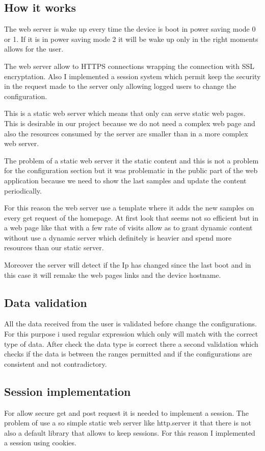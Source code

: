 		\subsection{How it works}
		The web server is wake up every time the device is boot in power saving mode 0 or 1. If it is in power saving mode 2 it will be wake up only in the right moments allows for the user.

		The web server allow to HTTPS connections wrapping the connection with SSL encryptation. Also I implemented a session system which permit keep the security in the request made to the server only allowing logged users to change the configuration.

		This is a static web server which means that only can serve static web pages. This is desirable in our project because we do not need a complex web page and also the resources consumed by the server are smaller than in a more complex web server.

		The problem of a static web server it the static content and this is not a problem for the configuration section but it was problematic in the public part of the web application because we need to show the last samples and update the content periodically.

		For this reason the web server use a template where it adds the new samples on every get request of the homepage. At first look that seems not so efficient but in a web page like that with a few rate of visits allow as to grant dynamic content without use a dynamic server which definitely is heavier and spend more resources than our static server.

		Moreover the server will detect if the Ip has changed since the last boot and in this case it will remake the web pages links and the device hostname. %

		\subsection{Data validation}
		All the data received from the user is validated before change the configurations. For this purpose i used regular expression which only will match with the correct type of data. After check the data type is correct there a second validation which checks if the data is between the ranges permitted and if the configurations are consistent and not contradictory.

		\subsection{Session implementation}
		For allow secure get and post request it is needed to implement a session. The problem of use a so simple static web server like http.server it that there is not also a default library that allows to keep sessions.
		For this reason I implemented a session using cookies.

